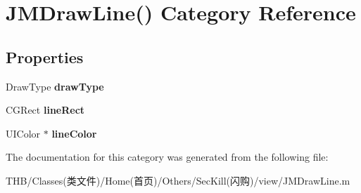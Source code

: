 \hypertarget{category_j_m_draw_line_07_08}{}\section{J\+M\+Draw\+Line() Category Reference}
\label{category_j_m_draw_line_07_08}
\subsection*{Properties}
\begin{DoxyCompactItemize}
\item 
\mbox{\label{category_j_m_draw_line_07_08_a4455ce2aad62de8f8b77a7474e501f2d}} 
Draw\+Type {\bfseries draw\+Type}
\item 
\mbox{\label{category_j_m_draw_line_07_08_a12d64706feb342f973e414b469aa5fab}} 
C\+G\+Rect {\bfseries line\+Rect}
\item 
\mbox{\label{category_j_m_draw_line_07_08_a06fbe5c3e9e9689f845b4fca21d6c802}} 
U\+I\+Color $\ast$ {\bfseries line\+Color}
\end{DoxyCompactItemize}


The documentation for this category was generated from the following file\+:\begin{DoxyCompactItemize}
\item 
T\+H\+B/\+Classes(类文件)/\+Home(首页)/\+Others/\+Sec\+Kill(闪购)/view/J\+M\+Draw\+Line.\+m\end{DoxyCompactItemize}

